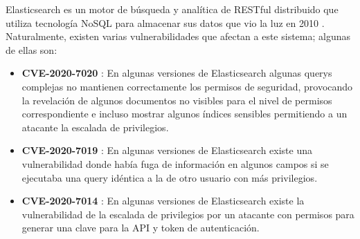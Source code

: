 \documentclass[a4paper,oneside]{article}
\begin{document}
Elasticsearch es un motor de búsqueda y analítica de RESTful distribuido que utiliza tecnología NoSQL para almacenar sus datos que vio la luz en 2010 \cite{elastic1}.
Naturalmente, existen varias vulnerabilidades que afectan a este sistema; algunas de ellas son:

\begin{itemize}
\item \textbf{CVE-2020-7020} \cite{CVE-2020-7020}: En algunas versiones de Elasticsearch algunas querys complejas no mantienen correctamente los permisos de seguridad, provocando la revelación de algunos documentos no visibles para el nivel de permisos correspondiente e incluso mostrar algunos índices sensibles permitiendo a un atacante la escalada de privilegios.
\item \textbf{CVE-2020-7019} \cite{CVE-2020-7019}: En algunas versiones de Elasticsearch existe una vulnerabilidad donde había fuga de información en algunos campos si se ejecutaba una query idéntica a la de otro usuario con más privilegios.
\item \textbf{CVE-2020-7014} \cite{CVE-2020-7014}: En algunas versiones de Elasticsearch existe la vulnerabilidad de la escalada de privilegios por un atacante con permisos para generar una clave para la API y token de autenticación.
\end{itemize}
\end{document}
